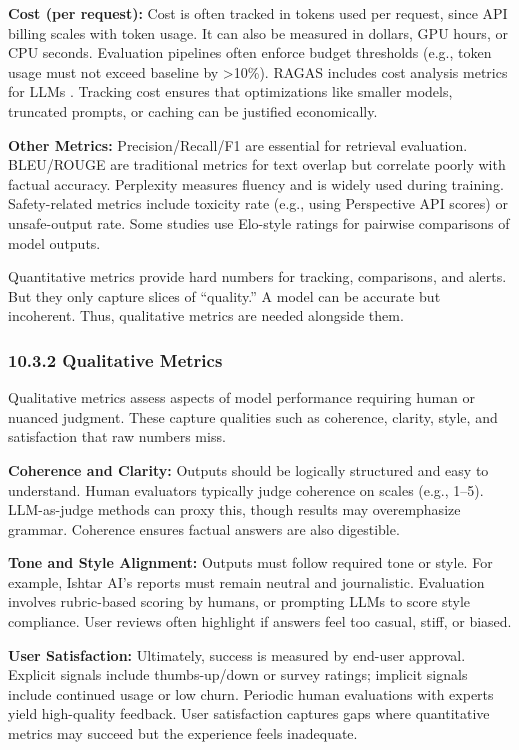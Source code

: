 \textbf{Cost (per request):} Cost is often tracked in tokens used per request, since API billing scales with token usage. It can also be measured in dollars, GPU hours, or CPU seconds. Evaluation pipelines often enforce budget thresholds (e.g., token usage must not exceed baseline by >10\%). RAGAS includes cost analysis metrics for LLMs \cite{ragasDocs}. Tracking cost ensures that optimizations like smaller models, truncated prompts, or caching can be justified economically.  

\textbf{Other Metrics:} Precision/Recall/F1 are essential for retrieval evaluation. BLEU/ROUGE are traditional metrics for text overlap but correlate poorly with factual accuracy. Perplexity measures fluency and is widely used during training. Safety-related metrics include toxicity rate (e.g., using Perspective API scores) or unsafe-output rate. Some studies use Elo-style ratings for pairwise comparisons of model outputs.  

Quantitative metrics provide hard numbers for tracking, comparisons, and alerts. But they only capture slices of “quality.” A model can be accurate but incoherent. Thus, qualitative metrics are needed alongside them.

\subsubsection*{10.3.2 Qualitative Metrics}
Qualitative metrics assess aspects of model performance requiring human or nuanced judgment. These capture qualities such as coherence, clarity, style, and satisfaction that raw numbers miss.  

\textbf{Coherence and Clarity:} Outputs should be logically structured and easy to understand. Human evaluators typically judge coherence on scales (e.g., 1–5). LLM-as-judge methods can proxy this, though results may overemphasize grammar. Coherence ensures factual answers are also digestible.  

\textbf{Tone and Style Alignment:} Outputs must follow required tone or style. For example, Ishtar AI’s reports must remain neutral and journalistic. Evaluation involves rubric-based scoring by humans, or prompting LLMs to score style compliance. User reviews often highlight if answers feel too casual, stiff, or biased.  

\textbf{User Satisfaction:} Ultimately, success is measured by end-user approval. Explicit signals include thumbs-up/down or survey ratings; implicit signals include continued usage or low churn. Periodic human evaluations with experts yield high-quality feedback. User satisfaction captures gaps where quantitative metrics may succeed but the experience feels inadequate.  

